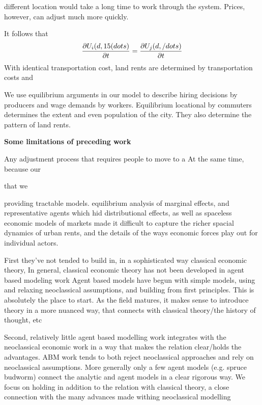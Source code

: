 different location would take a long time to work through the system. Prices, however, can adjust much more quickly. 

 It follows that 
\[\frac{\partial U_i(d,15(dots)}{\partial t}=\frac{\partial U_j(d, /dots)}{\partial t}\]
With identical transportation cost, 
land rents are determined by transportation costs  and  

We use  equilibrium arguments in our model to describe hiring decisions by producers and wage demands by workers. Equilibrium locational by commuters determines the extent and even population of the city. They also determine the pattern of land rents. 



\textbf{Some limitations of preceding work}%


Any adjustment process that requires people to move to a 
At the same time, because our  

that we 

providing tractable models.  equilibrium analysis of marginal effects, and representative agents which hid distributional effects, as well as spaceless economic models of markets made it difficult to capture the richer spacial dynamics of urban rents, and the details of the ways economic forces play out for individual actors.

First they've not tended to build in, in a sophisticated way classical economic theory,
In general, classical economic theory has not been developed in agent based modeling work
Agent based models have begun with simple models, using and relaxing neoclassical assumptions, and building from first principles. This is absolutely the place to start. As the field matures, it makes sense to introduce theory in a more nuanced way, that connects with classical theory/the history of thought, etc

Second, relatively little agent based modelling work integrates with the neoclassical economic work in a way that makes the relation clear/holds the advantages. ABM work tends to both reject neoclassical approaches and rely on neoclassical assumptions.
More generally only a few agent models (e.g. spruce budworm) connect the analytic and agent models in a clear rigorous way. We focus on holding in addition to the relation with classical theory, a close connection with the many advances made withing neoclassical modelling

